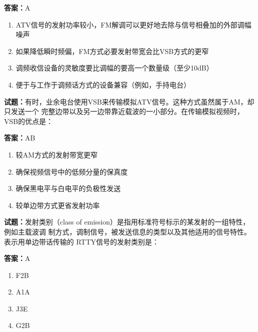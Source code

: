 \documentclass{ctexbook}
\begin{document}
\textbf{答案：}A 

\begin{enumerate}[leftmargin=3em]
  \item ATV信号的发射功率较小，FM解调可以更好地去除与信号相叠加的外部调幅噪声 

  \item 如果降低瞬时频偏，FM方式必要发射带宽会比VSB方式的更窄 

  \item 调频收信设备的灵敏度要比调幅的要高一个数量级（至少10dB） 

  \item 便于与工作于调频话方式的设备兼容（例如，手持电台） 

\end{enumerate}






\vspace{1em}

\textbf{试题：}有时，业余电台使用VSB来传输模拟ATV信号。这种方式虽然属于AM，却只发送一个
完整边带以及另一边带靠近载波的一小部分。在传输模拟视频时，VSB的优点是： 

\textbf{答案：}AB 

\begin{enumerate}[leftmargin=3em]
  \item 较AM方式的发射带宽更窄 

  \item 确保视频信号中的低频分量的保真度 

  \item 确保黑电平与白电平的负极性发送 

  \item 较单边带方式更省发射功率 

\end{enumerate}





\vspace{1em}

\textbf{试题：}发射类别（class of emission）是指用标准符号标示的某发射的一组特性，例如主载波调
制方式，调制信号，被发送信息的类型以及其他适用的信号特性。表示用单边带话传输的
RTTY信号的发射类别是： 

\textbf{答案：}A 

\begin{enumerate}[leftmargin=3em]
  \item F2B 

  \item A1A 

  \item J3E 

  \item G2B 

\end{enumerate}
\end{document}
